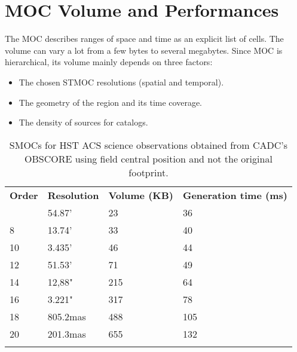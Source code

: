 \section{MOC Volume and Performances}
\label{app:perf}
The MOC describes ranges of space and time as an explicit list of cells. The
volume can vary a lot from a few bytes to several megabytes.
Since MOC is hierarchical, its volume mainly depends on three factors:
\begin{itemize}
\item The chosen STMOC resolutions (spatial and temporal).
\item The geometry of the region and its time coverage.
\item The density of sources for catalogs.   
\end{itemize}

\begin{table}[!htbp]
\begin{center}
{\scriptsize
\begin{tabular}{p{}p{}p{}p{}}
\sptablerule
\textbf{Order} & \textbf{Resolution} & \textbf{Volume (KB)} & \textbf{Generation \newline time (ms)}\\
\sptablerule
6	&	54.87'	&	23	&	36 \\
8	&	13.74'	&	33	&	40 \\
10	&	3.435'	&	46	&	44 \\
12	&	51.53'	&	71	&	49 \\
14	&	12,88"	&	215	&	64 \\
16	&	3.221"	&	317	&	78 \\
18	&	805.2mas	&	488	&	105 \\
20	&	201.3mas	&	655	&	132 \\
\sptablerule
\end{tabular}
\caption[SMOC performances]{SMOCs for HST ACS science observations
  obtained from CADC's OBSCORE using field central position and
  not the original footprint.}
\normalsize
\label{table:smocsizeacs}
}
\end{center}
\end{table}


